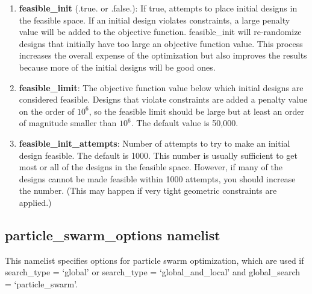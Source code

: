 \documentclass[11pt]{article}
\begin{document}
\begin{enumerate}
\item{\textbf{feasible\_init} (.true. or .false.): If true, attempts to place initial
designs in the feasible space.  If an initial design violates constraints, a large penalty
value will be added to the objective function.  feasible\_init will re-randomize
designs that initially have too large an objective function value.  
This process increases the overall expense of the optimization but also improves the 
results because more of the initial designs will be good ones.}
\item{\textbf{feasible\_limit}: The objective function value below which initial
designs are considered feasible.  Designs that violate constraints are added a penalty
value on the order of $10^6$, so the feasible limit should be large but at least an order
of magnitude smaller than $10^6$.  The default value is 50,000.}
\item{\textbf{feasible\_init\_attempts}: Number of attempts to try to make an initial
design feasible.  The default is 1000. This number is usually sufficient to get most or
all of the designs in the feasible space.  However, if many of the designs cannot be made
feasible within 1000 attempts, you should increase the number. (This may happen if very
tight geometric constraints are applied.)}
\end{enumerate}

\subsection{particle\_swarm\_options namelist}

This namelist specifies options for particle swarm optimization, which are used if
search\_type = `global' or search\_type = `global\_and\_local' and global\_search =
`particle\_swarm'.
\end{document}
